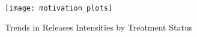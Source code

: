 \begin{figure}[H]
    \centering
    \texttt{[image: motivation\_plots]}
    \caption{Trends in Releases Intensities by Treatment Status}
    \label{fig:releases-plots-treatment}
\end{figure}